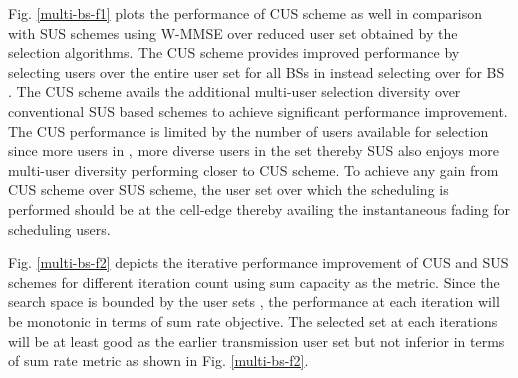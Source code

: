Fig. \ref{multi-bs-f1} plots the performance of CUS scheme as well in comparison with SUS schemes using W-MMSE over reduced user set obtained by the selection algorithms. The CUS scheme provides improved performance by selecting users over the entire user set  for all BSs in  instead selecting over  for BS . The CUS scheme avails the additional multi-user selection diversity over conventional SUS based schemes to achieve significant performance improvement. The CUS performance is limited by the number of users available for selection since more users in , more diverse users in the set thereby SUS also enjoys more multi-user diversity performing closer to CUS scheme. To achieve any gain from CUS scheme over SUS scheme, the user set  over which the scheduling is performed should be at the cell-edge thereby availing the instantaneous fading for scheduling users.

Fig. \ref{multi-bs-f2} depicts the iterative performance improvement of CUS and SUS schemes for different iteration count using sum capacity as the metric. Since the search space is bounded by the user sets , the performance at each iteration will be monotonic in terms of sum rate objective. The selected set at each iterations will be at least good as the earlier transmission user set  but not inferior in terms of sum rate metric as shown in Fig. \ref{multi-bs-f2}.
